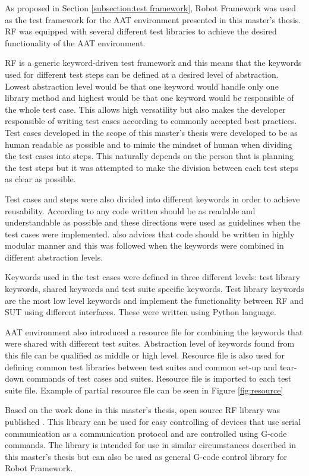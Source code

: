 As proposed in Section \ref{subsection:test framework}, Robot Framework was used as the test framework for the AAT environment presented in this master's thesis. RF was equipped with several different test libraries to achieve the desired functionality of the AAT environment.

RF is a generic keyword-driven test framework and this means that the keywords used for different test steps can be defined at a desired level of abstraction. Lowest abstraction level would be that one keyword would handle only one library method and highest would be that one keyword would be responsible of the whole test case. This allows high versatility but also makes the developer responsible of writing test cases according to commonly accepted best practices. Test cases developed in the scope of this master's thesis were developed to be as human readable as possible and to mimic the mindset of human when dividing the test cases into steps. This naturally depends on the person that is planning the test steps but it was attempted to make the division between each test steps as clear as possible.

Test cases and steps were also divided into different keywords in order to achieve reusability. According to \emph{\cite{clean-code}} any code written should be as readable and understandable as possible and these directions were used as guidelines when the test cases were implemented. \emph{\cite{clean-code}} also advices that code should be written in highly modular manner and this was followed when the keywords were combined in different abstraction levels.

Keywords used in the test cases were defined in three different levels: test library keywords, shared keywords and test suite specific keywords. Test library keywords are the most low level keywords and implement the functionality between RF and SUT using different interfaces. These were written using Python language. 

AAT environment also introduced a resource file for combining the keywords that were shared with different test suites. Abstraction level of keywords found from this file can be qualified as middle or high level. Resource file is also used for defining common test libraries between test suites and common set-up and tear-down commands of test cases and suites. Resource file is imported to each test suite file. Example of partial resource file can be seen in Figure \ref{fig:resource}

Based on the work done in this master's thesis, open source RF library was published \emph{\citep{cnc-library}}. This library can be used for easy controlling of devices that use serial communication as a communication protocol and are controlled using G-code commands. The library is intended for use in similar circumstances described in this master's thesis but can also be used as general G-code control library for Robot Framework.

